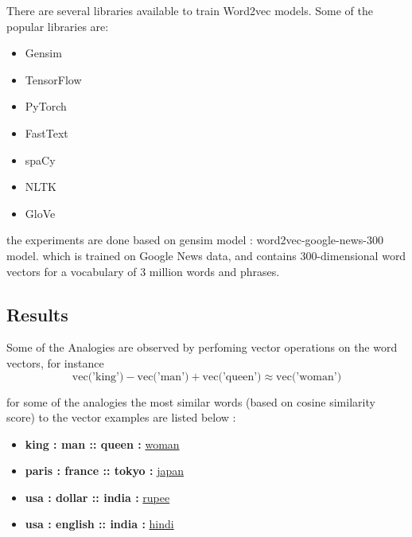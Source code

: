 There are several libraries available to train Word2vec models. Some of the popular libraries are:
\begin{itemize}
    \item Gensim
    \item TensorFlow
    \item PyTorch
    \item FastText
    \item spaCy
    \item NLTK
    \item GloVe
\end{itemize}

the experiments are done based on gensim model : word2vec-google-news-300 model.
which is trained on Google News data, and contains 300-dimensional word vectors for a vocabulary of 3 million words and phrases.

\subsection{Results}
Some of the Analogies are observed by perfoming vector operations on the word vectors, for instance 
$$
    \text{vec('king')} - \text{vec('man')} + \text{vec('queen')} \approx \text{vec('woman')}
$$

for some of the analogies the most similar words (based on cosine similarity score) to the vector examples are listed below :

\begin{itemize}
    \item {\bf king : man :: queen : } \underline{ woman }
    \item {\bf paris : france :: tokyo : } \underline{ japan }
    \item {\bf usa : dollar :: india : } \underline{ rupee }
    \item {\bf usa : english :: india : } \underline{ hindi }
\end{itemize}





